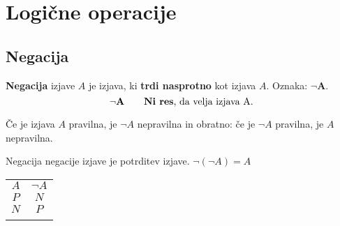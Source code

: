          

         
             \section{Logične operacije}

              \subsection{Negacija}
                \textbf{Negacija} izjave $A$ je izjava, ki \textbf{trdi nasprotno} 
                kot izjava $A$.
                Oznaka: $\mathbf{\lnot A}$.
                $$ \mathbf{\lnot A} \quad \quad \textmd{\textbf{Ni res}, da velja izjava A.}$$
             

                      
                        Če je izjava $A$ pravilna, je $\lnot A$ nepravilna in obratno: 
                        če je $\lnot A$ pravilna, je $A$ nepravilna.
                     
                      
                        Negacija negacije izjave je potrditev izjave. \quad $\lnot(\lnot A)=A$
                     

                \begin{table}[H]
                    \centering
                    \begin{tabular}{||c|c||} 
                    \hhline{|t:==:t|}
                    \rowcolor[rgb]{0.843,0.718,0.718} $A$ & $\lnot A$  \\ 
                    \hhline{|:==:|}
                    $P$                                   & $N$                       \\ 
                    \hline
                    $N$                                   & $P$                       \\
                    \hhline{|b:==:b|}
                    \end{tabular}                    
                \end{table}                

         

